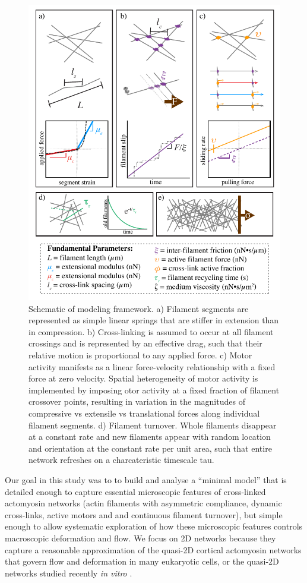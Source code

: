 \documentclass[10pt,letterpaper]{article}
\begin{document}
\begin{figure}[h!]
\centering
\includegraphics[width=\hsize]{figures/fig2/fig2}
\caption{\label{fig:sim} Schematic of modeling framework. a) Filament segments are represented as simple linear springs that are stiffer in extension than in compression. b) Cross-linking is assumed to occur at all filament crossings and is represented by an effective drag, such that their relative motion is proportional to any applied force. c) Motor activity manifests as a linear force-velocity relationship with a fixed force at zero velocity. Spatial heterogeneity of motor activity is implemented by imposing otor activity at a fixed fraction of filament crossover points, resulting in variation in the magnitudes of compressive vs extensile vs translational forces along individual filament segments. d) Filament turnover. Whole filaments disappear at a constant rate and new filaments appear with random location and orientation at the constant rate per unit area, such that entire network refreshes on a charcateristic timescale tau. }
\end{figure}

Our goal in this study was to to build and analyse a ``minimal model'' that is detailed enough to capture essential microscopic features of cross-linked actomyosin networks (actin filaments with asymmetric compliance, dynamic cross-links, active motors and and continuous filament turnover), but simple enough to allow systematic exploration of how these microscopic features controls macroscopic deformation and flow. We focus on 2D networks because they capture a reasonable approximation of the quasi-2D cortical actomyosin networks that govern flow and deformation in many eukaryotic cells\cite{cellmech_flows, salbreuxbphs}, or the quasi-2D networks studied recently {\em in vitro} \cite{rheo_2D1,rheo_2D2}.
\end{document}
